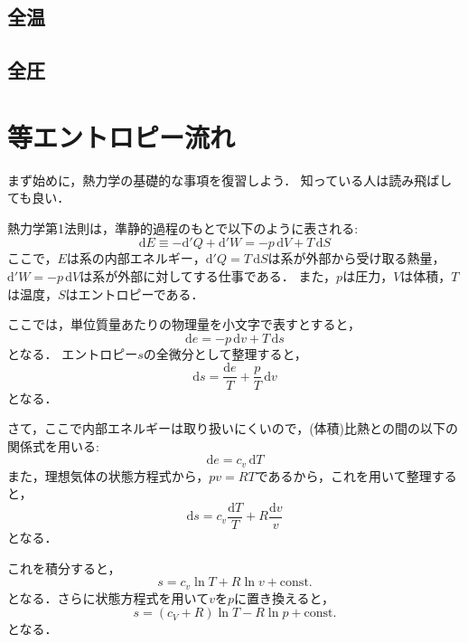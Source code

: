 \documentclass[uplatex,dvipdfmx,a4j,11pt]{jsreport}
\newcommand{\diff}{\mathrm{d}} %
\numberwithin{equation}{chapter}
\begin{document}
\subsection{全温}

\subsection{全圧}

\section{等エントロピー流れ}

まず始めに，熱力学の基礎的な事項を復習しよう．
知っている人は読み飛ばしても良い．

熱力学第1法則は，準静的過程のもとで以下のように表される:
\begin{equation}
  \diff E \equiv -\diff'Q + \diff'W = -p \, \diff V + T \, \diff S
\end{equation}
ここで，$E$は系の内部エネルギー，$\diff'Q = T \, \diff S$は系が外部から受け取る熱量，$\diff'W = -p \, \diff V$は系が外部に対してする仕事である．
また，$p$は圧力，$V$は体積，$T$は温度，$S$はエントロピーである．

ここでは，単位質量あたりの物理量を小文字で表すとすると，
\begin{equation}
  \diff e = -p \, \diff v + T \, \diff s
\end{equation}
となる．
エントロピー$s$の全微分として整理すると，
\begin{equation}
  \diff s = \frac{\diff e}{T} + \frac{p}{T} \, \diff v
\end{equation}
となる．

さて，ここで内部エネルギーは取り扱いにくいので，(体積)比熱との間の以下の関係式を用いる:
\begin{equation}
  \diff e = c_v \, \diff T
\end{equation}
また，理想気体の状態方程式から，$pv = RT$であるから，これを用いて整理すると，
\begin{equation}
  \diff s = c_v \frac{\diff T}{T} + R \frac{\diff v}{v}
\end{equation}
となる．

これを積分すると，
\begin{equation}
  s = c_v \ln T + R \ln v + \text{const.}
\end{equation}
となる．さらに状態方程式を用いて$v$を$p$に置き換えると，
\begin{equation}
  s = (c_V + R) \ln T - R \ln p + \text{const.}
  \label{eq:entropy_ideal_gas}
\end{equation}
となる．
\end{document}
